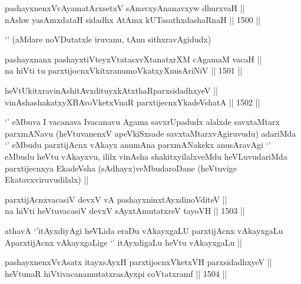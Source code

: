 \begin{shl}
pashayxnenxVvAyamatArx\s \s setxV sAnavxyAnanavxyw dhurxvaH || \\
nAshw yasAmxdataH sidadhx AtAmx kUTasathxdashaRnaH ||  1500 ||  
\end{shl}

\begin{artha}
`\stext' (aMdare noVDutatxle iruvanu, tAnu sithxravAgidudx) 
\end{artha}


\begin{shl}
pashayxnanx pashayxtiVteyxVtatasxvXtanatxrXM cA\s \s gamaM vacaH || \\
na hiVti tu parxtijocnxVkitxranumoVkatxyXnusAriNiV ||  1501 ||  
\end{shl}
				
\begin{shl}
heVtUkitxravinAshitAvxdituyxkAtxthaRparxsidadhxyeV || \\
vinAshashakatxyXBAvoVketxVnaR parxtijecnxYkadeVshatA ||  1502 ||  
\end{shl}

\begin{artha}
`\stext' eMbuva I vacanava Ivacanavu Agama savxrUpadudx alalxde savxtaMtarx parxmANavu (heVtuvanenxV apeVkiSxsade savxtaMtarxvAgiruvudu) adariMda `\stext' eMbudu parxtijAcnx vAkayx anumAna parxmANakekx anusAravAgi `\stext' eMbudu heVtu vAkayxvu, ililx vinAsha shakitxyilalxveMdu heVLuvudariMda parxtijecnxya EkadeVsha (sAdhayx)veMbudaroDane (heVtuvige Ekatavxviruvudilalx) ||
\end{artha}


\begin{shl}
parxtijAcnxvacasiV devxV vA pashayxninxtAyxdinoVditeV || \\
na hiVti heVtuvacasiV devxV sAyxtAmutatxreV tayoVH ||  1503 ||  
\end{shl}

\begin{artha}
athavA `\stext'itAyxdiyAgi heVLida eraDu vAkayxgaLU parxtijAcnx vAkayxgaLu AparxtijAcnx vAkayxgaLige `\stext' itAyxdigaLu heVtu vAkayxgaLu ||
\end{artha}


\begin{shl}
pashayxnenxVvA\s \s satx itayxsAyxH parxtijocnxVketxVH parxsidadhxyeV || \\
heVtunaR hiVtivacanamutatxrasAyxpi coVtatxramf ||  1504 ||  
\end{shl}

